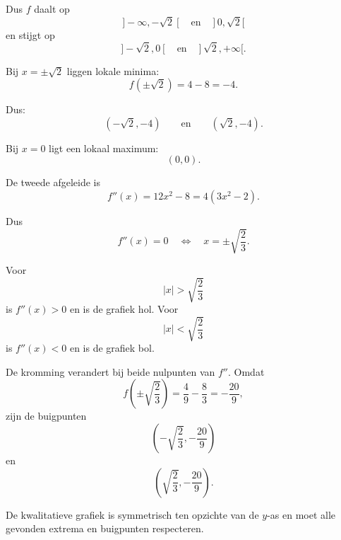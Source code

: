 \documentclass{ximera}
\begin{document}
\begin{oefening}{\oefU\ESS}
\begin{oplossing}
Dus $f$ daalt op
\[
]-\infty,-\sqrt2[
\quad\text{en}\quad
]0,\sqrt2[
\]
en stijgt op
\[
]-\sqrt2,0[
\quad\text{en}\quad
]\sqrt2,+\infty[.
\]

Bij $x=\pm\sqrt2$ liggen lokale minima:
\[
f(\pm\sqrt2)=4-8=-4.
\]

Dus:
\[
\boxed{(-\sqrt2,-4)}
\qquad\text{en}\qquad
\boxed{(\sqrt2,-4)}.
\]

Bij $x=0$ ligt een lokaal maximum:
\[
\boxed{(0,0)}.
\]

De tweede afgeleide is
\[
f''(x)=12x^2-8
=4(3x^2-2).
\]

Dus
\[
f''(x)=0
\quad\Longleftrightarrow\quad
x=\pm\sqrt{\frac23}.
\]

Voor
\[
|x|>\sqrt{\frac23}
\]
is $f''(x)>0$ en is de grafiek hol. Voor
\[
|x|<\sqrt{\frac23}
\]
is $f''(x)<0$ en is de grafiek bol.

De kromming verandert bij beide nulpunten van $f''$. Omdat
\[
f\left(\pm\sqrt{\frac23}\right)
=
\frac49-\frac83
=
-\frac{20}{9},
\]
zijn de buigpunten
\[
\boxed{\left(-\sqrt{\frac23},-\frac{20}{9}\right)}
\]
en
\[
\boxed{\left(\sqrt{\frac23},-\frac{20}{9}\right)}.
\]

De kwalitatieve grafiek is symmetrisch ten opzichte van de $y$-as en moet
alle gevonden extrema en buigpunten respecteren.

\end{oplossing}

\end{oefening}


\end{document}
